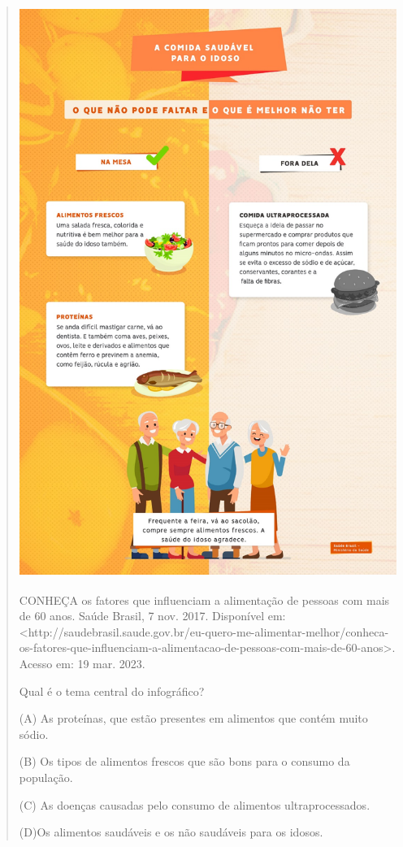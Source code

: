 \begin{escolha}
\begin{escolha}
{\begin{quote}
\includegraphics[width=4.87500in,height=7.31250in]{media/image38.jpeg}

CONHEÇA os fatores que influenciam a alimentação de pessoas com mais de
60 anos. Saúde Brasil, 7 nov. 2017. Disponível em:
\textless{}http://saudebrasil.saude.gov.br/eu-quero-me-alimentar-melhor/conheca-os-fatores-que-influenciam-a-alimentacao-de-pessoas-com-mais-de-60-anos\textgreater{}.
Acesso em: 19 mar. 2023.

Qual é o tema central do infográfico?

(A) As proteínas, que estão presentes em alimentos que contém muito
sódio.

(B) Os tipos de alimentos frescos que são bons para o consumo da
população.

(C) As doenças causadas pelo consumo de alimentos ultraprocessados.

(D)Os alimentos saudáveis e os não saudáveis para os idosos.


\end{quote}}
\end{escolha}
\end{escolha}
